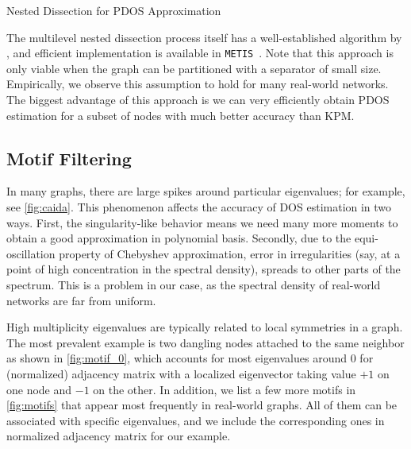 \begin{algorithm}
	\DontPrintSemicolon
	\caption{Nested Dissection for PDOS Approximation}
	\label{alg:ndpdos}        
\end{algorithm}

The multilevel nested dissection process itself has a well-established
algorithm by \citeauthor{karypis1998fast}, and efficient implementation is
available in \texttt{METIS}~\cite{karypis1998fast}. Note that this approach is
only viable when the graph can be partitioned with a separator of small size.
Empirically, we observe this assumption to hold for many real-world networks.
The biggest advantage of this approach is we can very efficiently obtain PDOS
estimation for a subset of nodes with much better accuracy than KPM.


\subsection{Motif Filtering}

In many graphs, there are large spikes around particular eigenvalues; for
example, see \cref{fig:caida}. This phenomenon affects the accuracy of DOS
estimation in two ways. First, the singularity-like behavior means we need many
more moments to obtain a good approximation in polynomial basis. Secondly, due
to the equi-oscillation property of Chebyshev approximation, error in
irregularities (say, at a point of high concentration in the spectral density),
spreads to other parts of the spectrum. This is a problem in our case, as the
spectral density of real-world networks are far from uniform.

High multiplicity eigenvalues are typically related to local symmetries in a
graph. The most prevalent example is two dangling nodes attached to the same
neighbor as shown in \cref{fig:motif_0}, which accounts for most eigenvalues
around $0$ for (normalized) adjacency matrix with a localized eigenvector taking
value $+1$ on one node and $-1$ on the other. In addition, we list a few more
motifs in \cref{fig:motifs} that appear most frequently in real-world graphs.
All of them can be associated with specific eigenvalues, and we include the
corresponding ones in normalized adjacency matrix for our example.

